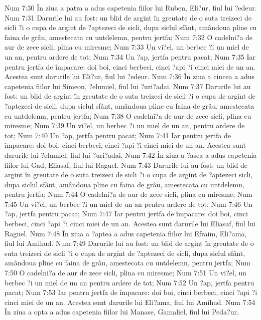 Num 7:30  În ziua a patra a adus capetenia fiilor lui Ruben, Eli?ur, fiul lui ?edeur.
Num 7:31  Darurile lui au fost: un blid de argint în greutate de o suta treizeci de sicli ?i o cupa de argint de ?aptezeci de sicli, dupa siclul sfânt, amândoua pline cu faina de grâu, amestecata cu untdelemn, pentru jertfa;
Num 7:32  O cadelni?a de aur de zece sicli, plina cu miresme;
Num 7:33  Un vi?el, un berbec ?i un miel de un an, pentru ardere de tot;
Num 7:34  Un ?ap, jertfa pentru pacat;
Num 7:35  Iar pentru jertfa de împacare: doi boi, cinci berbeci, cinci ?api ?i cinci miei de un an. Acestea sunt darurile lui Eli?ur, fiul lui ?edeur.
Num 7:36  În ziua a cincea a adus capetenia fiilor lui Simeon, ?elumiel, fiul lui ?uri?adai.
Num 7:37  Darurile lui au fost: un blid de argint în greutate de o suta treizeci de sicli ?i o cupa de argint de ?aptezeci de sicli, dupa siclul sfânt, amândoua pline cu faina de grâu, amestecata cu untdelemn, pentru jertfa;
Num 7:38  O cadelni?a de aur de zece sicli, plina cu miresme;
Num 7:39  Un vi?el, un berbec ?i un miel de un an, pentru ardere de tot;
Num 7:40  Un ?ap, jertfa pentru pacat;
Num 7:41  Iar pentru jertfa de împacare: doi boi, cinci berbeci, cinci ?api ?i cinci miei de un an. Acestea sunt darurile lui ?elumiel, fiul lui ?uri?adai.
Num 7:42  În ziua a ?asea a adus capetenia fiilor lui Gad, Eliasaf, fiul lui Raguel.
Num 7:43  Darurile lui au fost: un blid de argint în greutate de o suta treizeci de sicli ?i o cupa de argint de ?aptezeci sicli, dupa siclul sfânt, amândoua pline cu faina de grâu, amestecata cu untdelemn, pentru jertfa;
Num 7:44  O cadelni?a de aur de zece sicli, plina cu miresme;
Num 7:45  Un vi?el, un berbec ?i un miel de un an pentru ardere de tot;
Num 7:46  Un ?ap, jertfa pentru pacat;
Num 7:47  Iar pentru jertfa de împacare: doi boi, cinci berbeci, cinci ?api ?i cinci miei de un an. Acestea sunt darurile lui Eliasaf, fiul lui Raguel.
Num 7:48  În ziua a ?aptea a adus capetenia fiilor lui Efraim, Eli?ama, fiul lui Amihud.
Num 7:49  Darurile lui au fost: un blid de argint în greutate de o suta treizeci de sicli ?i o cupa de argint de ?aptezeci de sicli, dupa siclul sfânt, amândoua pline cu faina de grâu, amestecata cu untdelemn, pentru jertfa;
Num 7:50  O cadelni?a de aur de zece sicli, plina cu miresme;
Num 7:51  Un vi?el, un berbec ?i un miel de un an pentru ardere de tot;
Num 7:52  Un ?ap, jertfa pentru pacat;
Num 7:53  Iar pentru jertfa de împacare: doi boi, cinci berbeci, cinci ?api ?i cinci miei de un an. Acestea sunt darurile lui Eli?ama, fiul lui Amihud.
Num 7:54  În ziua a opta a adus capetenia fiilor lui Manase, Gamaliel, fiul lui Peda?ur.
